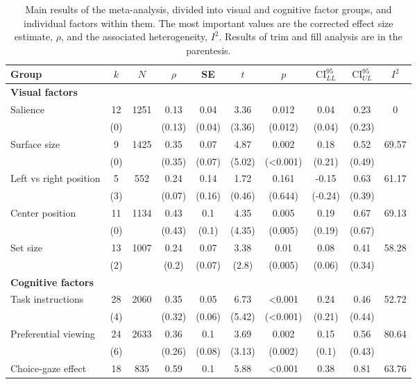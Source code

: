 \begin{table}[ht]
\centering
\caption{Main results of the meta-analysis, divided into visual and cognitive factor groups, and individual factors within them. The most important values are the corrected effect size estimate, $\rho$, and the associated heterogeneity, $I^2$. Results of trim and fill analysis are in the parentesis.} 
\label{tab:main_results}
\begingroup\small
\begin{tabular}{lccccccccc}
  \hline
Group & $k$ & $N$ & $\rho$ & SE & $t$ & $p$ & $\textrm{CI}^{95}_{LL}$ & $\textrm{CI}^{95}_{UL}$ & $I^2$ \\ 
  \hline
\textbf{Visual factors} &  &  &  &  &  &  &  &  &  \\ 
  Salience & 12 & 1251 & 0.13 & 0.04 & 3.36 & 0.012 & 0.04 & 0.23 & 0 \\ 
   & (0) &  & (0.13) & (0.04) & (3.36) & (0.012) & (0.04) & (0.23) &  \\ 
  Surface size & 9 & 1425 & 0.35 & 0.07 & 4.87 & 0.002 & 0.18 & 0.52 & 69.57 \\ 
   & (0) &  & (0.35) & (0.07) & (5.02) & (<0.001) & (0.21) & (0.49) &  \\ 
  Left vs right position & 5 & 552 & 0.24 & 0.14 & 1.72 & 0.161 & -0.15 & 0.63 & 61.17 \\ 
   & (3) &  & (0.07) & (0.16) & (0.46) & (0.644) & (-0.24) & (0.39) &  \\ 
  Center position & 11 & 1134 & 0.43 & 0.1 & 4.35 & 0.005 & 0.19 & 0.67 & 69.13 \\ 
   & (0) &  & (0.43) & (0.1) & (4.35) & (0.005) & (0.19) & (0.67) &  \\ 
  Set size & 13 & 1007 & 0.24 & 0.07 & 3.38 & 0.01 & 0.08 & 0.41 & 58.28 \\ 
   & (2) &  & (0.2) & (0.07) & (2.8) & (0.005) & (0.06) & (0.34) &  \\ 
  \textbf{Cognitive factors} &  &  &  &  &  &  &  &  &  \\ 
  Task instructions & 28 & 2060 & 0.35 & 0.05 & 6.73 & <0.001 & 0.24 & 0.46 & 52.72 \\ 
   & (4) &  & (0.32) & (0.06) & (5.42) & (<0.001) & (0.21) & (0.44) &  \\ 
  Preferential viewing & 24 & 2633 & 0.36 & 0.1 & 3.69 & 0.002 & 0.15 & 0.56 & 80.64 \\ 
   & (6) &  & (0.26) & (0.08) & (3.13) & (0.002) & (0.1) & (0.43) &  \\ 
  Choice-gaze effect & 18 & 835 & 0.59 & 0.1 & 5.88 & <0.001 & 0.38 & 0.81 & 63.76 \\ 

\end{tabular}
\end{table}
